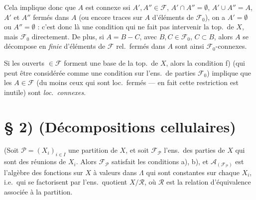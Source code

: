 \documentclass[11pt,a4paper]{article}
\begin{document}
Cela implique donc que $A$  est connexe
ssi \struck{\ill{}} $A', A'' \in \mathcal{F}$, $A' \cap A'' = \emptyset$,
$A' \cup A'' = A$, $A'$ et $A''$ fermés dans $A$ (ou encore traces sur $A$
d'éléments de $\mathcal{F}_0$), on a $A' = \emptyset$ ou $A'' = \emptyset$ :
c'est donc là une condition qui ne fait pas intervenir la top.\ de $X$, mais
$\mathcal{F}_0$ directement. De plus,  
 si $A = B - C$, avec $B, C \in \mathcal{F}_0$, $C
\subset B$, alors $A$ se décompose en  
 \emph{finie}
d'éléments de $\mathcal{F}$ rel.\ fermés dans $A$  sont ainsi
$\mathcal{F}_0$-connexes. 

Si les ouverts $\in \mathcal{F}$ forment une base de la top.\ de $X$, alors
la condition f) (qui peut être considérée comme une condition sur l'ens.\ de
parties $\mathcal{F}_0$) implique que les $A \in \mathcal{F}$ (du moins
ceux qui sont loc.\ fermés --- en fait cette restriction est inutile) sont
\emph{loc.\ connexes}.

\section*{§ 2) (Décompositions cellulaires)}

(Soit $\mathcal{P} = (X_i)_{i \in I}$ une partition 
de $X$, et soit $\mathcal{F}_{\mathcal{P}}$ l'ens.\ des parties de $X$ qui
sont des réunions \struck{\ill{}} de $X_i$. Alors \struck{\ill{}}
$\mathcal{F}_{\mathcal{P}}$ satisfait les conditions a), b), et
$\mathcal{A}_{(\mathcal{F}_{\mathcal{P}})}$ est l'algèbre des fonctions sur
$X$ à valeurs dans $\Lambda$ qui sont constantes sur chaque $X_i$, i.e.\ qui
se factorisent par l'ens.\ quotient $X/\mathcal{R}$, où $\mathcal{R}$ est la
relation d'équivalence associée à la partition.

\end{document}
